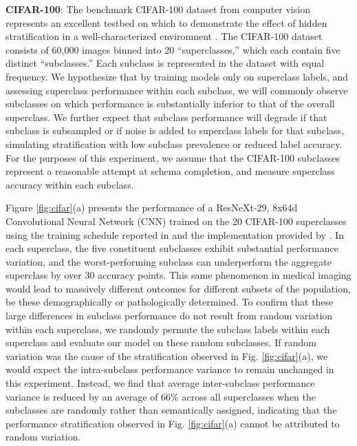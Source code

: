\documentclass[sigconf,anonymous,review]{acmart}
\begin{document}
\textbf{CIFAR-100}: The benchmark CIFAR-100 dataset from computer vision represents an excellent testbed on which to demonstrate the effect of hidden stratification in a well-characterized environment \citep{Krizhevsky2009-tq}.  
The CIFAR-100 dataset consists of 60,000 images binned into 20 ``superclasses,'' which each contain five distinct ``subclasses.'' 
 Each subclass is represented in the dataset with equal frequency.  
 We hypothesize that by training models only on superclass labels, and assessing superclass performance within each subclass, we will commonly observe subclasses on which performance is substantially inferior to that of the overall superclass.  
  We further expect that subclass performance will degrade if that subclass is subsampled or if noise is added to superclass labels for that subclass, simulating stratification with low subclass prevalence or reduced label accuracy.
 For the purposes of this experiment, we assume that the CIFAR-100 subclasses represent a reasonable attempt at schema completion, and measure superclass accuracy within each subclass.
 
 Figure \ref{fig:cifar}(a) presents the performance of a ResNeXt-29, 8x64d Convolutional Neural Network (CNN) trained on the 20 CIFAR-100 superclasses using the training schedule reported in \citep{Xie2016-ip} and the implementation provided by \citep{Yang_undated-bt}.  
In each superclass, the five constituent subclasses exhibit substantial performance variation, and the worst-performing subclass can underperform the aggregate superclass by over 30 accuracy points.  
This same phenomenon in medical imaging would lead to massively different outcomes for different subsets of the population, be these demographically or pathologically determined.
To confirm that these large differences in subclass performance do not result from random variation within each superclass, we randomly permute the subclass labels within each superclass and evaluate our model on these random subclasses.
If random variation was the cause of the stratification observed in Fig. \ref{fig:cifar}(a), we would expect the intra-subclass performance variance to remain unchanged in this experiment.
 Instead, we find that average inter-subclass performance variance is reduced by an average of 66\% across all superclasses when the subclasses are randomly rather than semantically assigned, indicating that the performance stratification observed in Fig. \ref{fig:cifar}(a) cannot be attributed to random variation.
\end{document}
